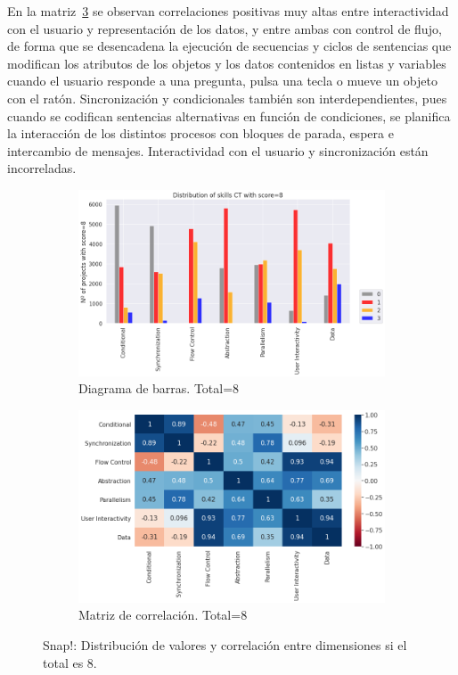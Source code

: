 \documentclass[a4paper, 12pt]{book}
\begin{document}
En la matriz~\ref{fig:corr8_Snap} se observan correlaciones positivas muy altas entre interactividad con el usuario y representación de los datos, y entre ambas con control de flujo, de forma que se desencadena la ejecución de secuencias y ciclos de sentencias que modifican los atributos de los objetos y los datos contenidos en listas y variables cuando el usuario responde a una pregunta, pulsa una tecla o mueve un objeto con el ratón. Sincronización y condicionales también son interdependientes, pues cuando se codifican sentencias alternativas en función de condiciones, se planifica la interacción de los distintos procesos con bloques de parada, espera e intercambio de mensajes. Interactividad con el usuario y sincronización están incorreladas.

\begin{figure}[H]
    \centering
    \begin{subfigure}[h]{.49\textwidth} 
        \includegraphics[width=\textwidth]{img/distribucion_8_Snap}
        \caption{Diagrama de barras. Total=8}
        \label{fig:total8_Snap}
    \end{subfigure}       
    \begin{subfigure}[h]{.49\textwidth} 
        \includegraphics[width=\textwidth]{img/corr_8_Snap}
        \caption{Matriz de correlación. Total=8}
        \label{fig:corr8_Snap}
    \end{subfigure}
    \caption{Snap!: Distribución de valores y correlación entre dimensiones si el total es 8.}
\end{figure}
\end{document}
